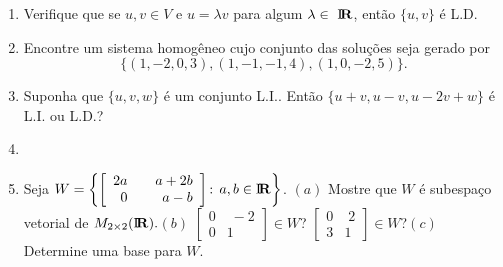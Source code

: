 \documentclass{report}
\begin{document}
\begin{Exercise}
\begin{enumerate}

\item \label{13lista3} Verifique que se $u,v\in V$ e $u=\lambda v$
para algum $\lambda \in
\Bbb{\ }%
\mbox{${\rm I}\!\mbox{\boldmath $ {\rm R}$}$}%
$, ent\~{a}o $\{u,v\}$ \'{e} L.D.


\item \label{14lista3} Encontre um sistema homog\^{e}neo cujo
conjunto das solu\c{c}\~{o}es seja gerado por
\[
\{(1,-2,0,3),(1,-1,-1,4),(1,0,-2,5)\}.
\]


\item \label{15lista3} Suponha que $\{u,v,w\}$ \'{e} um conjunto L.I.. Ent\~{a}o $%
\{u+v,u-v,u-2v+w\}$ \'{e} L.I. ou L.D.?


\item \label{16lista3} \item  Seja $W=\left\{ \left[
\begin{array}{rr}
2a & \quad a+2b \\
0 & a-b
\end{array}
\right] \text{: }a,b\in
\mbox{${\rm I}\!\mbox{\boldmath $ {\rm R}$}$}%
\right\} $.\newline
$(a)$ Mostre que $W$ \'{e} subespa\c{c}o vetorial de $M_{2\times 2}(%
\mbox{${\rm I}\!\mbox{\boldmath $ {\rm R}$}$}%
).$\newline $(b)$ $\left[
\begin{array}{rr}
0 & \;-2 \\
0 & 1
\end{array}
\right] \in W$? $\left[
\begin{array}{rr}
0 & \;2 \\
3 & 1
\end{array}
\right] \in W$?\newline $(c)$ Determine uma base para $W$.


\end{enumerate}
\end{Exercise}
\end{document}

